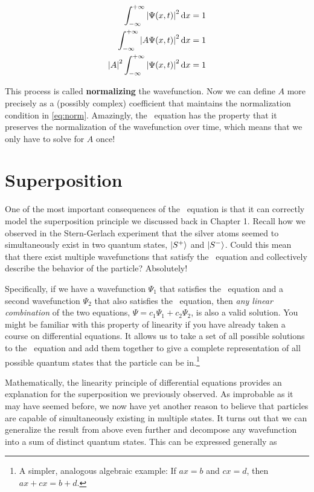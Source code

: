 \begin{align*}
	\int_{-\infty}^{+\infty} \abs{\Psi(x,t)}^2 \dd{x} &= 1 \\
	\int_{-\infty}^{+\infty} \abs{A\Psi(x,t)}^2 \dd{x} &= 1 \\
	\abs{A}^2 \int_{-\infty}^{+\infty} \abs{\Psi(x,t)}^2 \dd{x} &= 1
\end{align*}

This process is called \textbf{normalizing} the wavefunction. 
Now we can define $A$ more precisely as a (possibly complex) coefficient that maintains the normalization condition in \autoref{eq:norm}. 
Amazingly, the \Sch\ equation has the property that it preserves the normalization of the wavefunction over time, which means that we only have to solve for $A$ once!


\section{Superposition} \label{sec:super}

One of the most important consequences of the \Sch\ equation is that it can correctly model the superposition principle we discussed back in Chapter 1. 
Recall how we observed in the Stern-Gerlach experiment that the silver atoms seemed to simultaneously exist in two quantum states, $\ket{S^+}$ and $\ket{S^-}$. 
Could this mean that there exist multiple wavefunctions that satisfy the \Sch\ equation and collectively describe the behavior of the particle? 
Absolutely! 

Specifically, if we have a wavefunction $\Psi_1$ that satisfies the \Sch\ equation and a second wavefunction $\Psi_2$ that also satisfies the \Sch\ equation, then \emph{any linear combination} of the two equations, $\Psi = c_1\Psi_1 + c_2\Psi_2$, is also a valid solution. 
You might be familiar with this property of linearity if you have already taken a course on differential equations. 
It allows us to take a set of all possible solutions to the \Sch\ equation and add them together to give a complete representation of all possible quantum states that the particle can be in.\footnote{A simpler, analogous algebraic example: If $ax = b$ and $cx = d$, then $ax + cx = b + d$.}

Mathematically, the linearity principle of differential equations provides an explanation for the superposition we previously observed. 
As improbable as it may have seemed before, we now have yet another reason to believe that particles are capable of simultaneously existing in multiple states. 
It turns out that we can generalize the result from above even further and decompose any wavefunction into a sum of distinct quantum states. 
This can be expressed generally as


